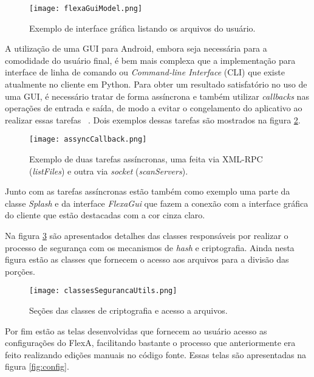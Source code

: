         \begin{figure}[!ht]
        \centering
        \texttt{[image: flexaGuiModel.png]}
        \caption{Exemplo de interface gráfica listando os arquivos do usuário.}
        \label{fig:flexaGuiModel}
        \end{figure}
        
        A utilização de uma GUI para Android, embora seja necessária para a comodidade do usuário final, é bem mais complexa que a implementação para interface de linha de comando ou \textit{Command-line Interface} (CLI) que existe atualmente no cliente em Python. Para obter um resultado satisfatório no uso de uma GUI, é necessário tratar de forma assíncrona e também utilizar \textit{callbacks} nas operações de entrada e saída, de modo a evitar o congelamento do aplicativo ao realizar essas tarefas ~\cite{androidAssyncTask}. Dois exemplos dessas tarefas são mostrados na figura \ref{fig:assyncCallback}.
        
        \begin{figure}[!ht]
        \centering
        \texttt{[image: assyncCallback.png]}
        \caption{Exemplo de duas tarefas assíncronas, uma feita via XML-RPC (\textit{listFiles}) e outra via \textit{socket} (\textit{scanServers}).}
        \label{fig:assyncCallback}
        \end{figure}
        
    Junto com as tarefas assíncronas estão também como exemplo uma parte da classe \textit{Splash} e da interface \textit{FlexaGui} que fazem a conexão com a interface gráfica do cliente que estão destacadas com a cor cinza claro.
    
    Na figura \ref{fig:classesSeg} são apresentados detalhes das classes responsáveis por realizar o processo de segurança com os mecanismos de \textit{hash} e criptografia. Ainda nesta figura estão as classes que fornecem o acesso aos arquivos para a divisão das porções.
    
        \begin{figure}[!ht]
        \centering
        \texttt{[image: classesSegurancaUtils.png]}
        \caption{Seções das classes de criptografia e acesso a arquivos.}
        \label{fig:classesSeg}
        \end{figure}
        
    Por fim estão as telas desenvolvidas que fornecem ao usuário acesso as configurações do FlexA, facilitando bastante o processo que anteriormente era feito realizando edições manuais no código fonte. Essas telas são apresentadas na figura \ref{fig:config}.
    
